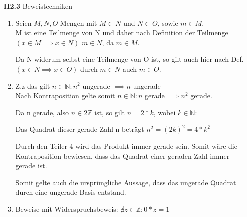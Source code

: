 \documentclass[a4paper,abstract,german]{scrreprt}
\newcommand{\N}{\mathbb{N}}
\newcommand{\Z}{\mathbb{Z}}
\begin{document}
\begin{enumerate}
		\item[\textbf {H2.3}]
	Beweistechniken
	\begin{enumerate}
	\item
    	Seien $M,N, O$ Mengen mit $M \subset N$ und $N \subset O$, sowie $m \in M$.\\
    	
    	M ist eine Teilmenge von N und daher nach Definition der Teilmenge $(x \in M \implies x \in N)$ $m \in N$, da $m \in M$.
    	
    	Da N widerum selbst eine Teilmenge von O ist, so gilt auch hier nach Def. $(x \in N \implies x \in O)$ durch $m \in N$ auch $m \in O$.
    
    \item
    	Z.z das gilt $n \in \mathbb{N}: n^2$ ungerade $\implies n$ ungerade\\  
    	Nach Kontraposition gelte somit $ n \in \mathbb{N}: n$ gerade $\implies n^2$ gerade.
    	
    	Da n gerade, also $n \in 2\Z$ ist, so gilt $n = 2*k$, wobei $k \in \N $:
    	
    	Das Quadrat dieser gerade Zahl n beträgt $ n^2 = (2k)^2 = 4*k^2 $
    	
    	Durch den Teiler $4$ wird das Produkt immer gerade sein. Somit wäre die Kontraposition bewiesen, dass das Quadrat einer geraden Zahl immer gerade ist.
    	
    	Somit gelte auch die ursprüngliche Aussage, dass das ungerade Quadrat durch eine ungerade Basis entstand.
    \item
        Beweise mit Widerspruchsbeweis: $\nexists z \in \mathbb{Z}: 0*z=1$\\
    	

	\end{enumerate}

\end{enumerate}
\end{document}

